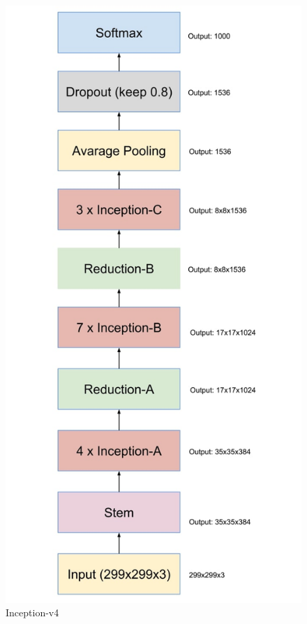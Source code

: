 \documentclass[titlepage]{report}
\begin{document}
\begin{figure}[h!]
    \centering
    \includegraphics[scale=0.3]{inception_v4}
    \caption{Inception-v4}
    \label{fig:inception_v4}
\end{figure}
\pagebreak
\end{document}
